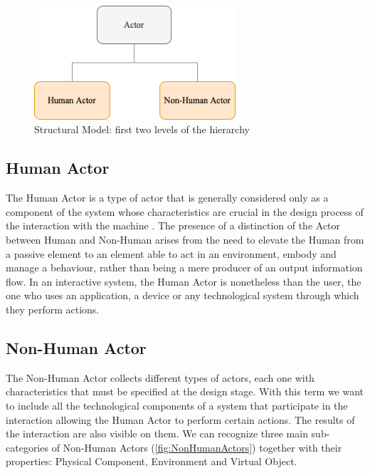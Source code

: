\begin{figure}[h]
	\centering
	\includegraphics[width=7.5cm]{Figures/Conceptual Model/Actor_Human_NonHuman.png}
	\caption{Structural Model: first two levels of the hierarchy}
	\label{fig:ActorHumanNonHuman}
\end{figure}

\subsection*{Human Actor}
The Human Actor is a type of actor that is generally considered only as a component of the system whose characteristics are crucial in the design process of the interaction with the machine \cite{bannon_discovering_1989}. The presence of a distinction of the Actor between Human and Non-Human arises from the need to elevate the Human from a passive element to an element able to act in an environment, embody and manage a behaviour, rather than being a mere producer of an output information flow. In an interactive system, the Human Actor is nonetheless than the user, the one who uses an application, a device or any technological system through which they perform actions. 

\subsection*{Non-Human Actor}
The Non-Human Actor collects different types of actors, each one with characteristics that must be specified at the design stage. With this term we want to include all the technological components of a system that participate in the interaction allowing the Human Actor to perform certain actions. The results of the interaction are also visible on them.  We can recognize three main sub-categories of Non-Human Actors (\autoref{fig:NonHumanActors}) together with their properties: Physical Component, Environment and Virtual Object.


